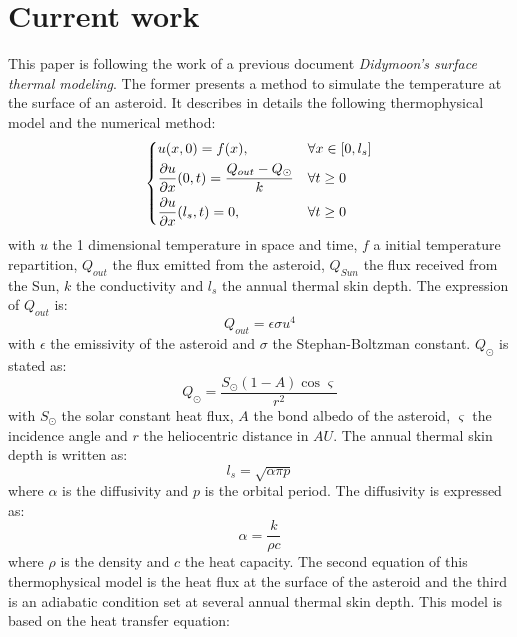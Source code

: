 \section{Current work}
\label{sec:2}

This paper is following the work of a previous document \textit{Didymoon's surface thermal modeling}. The former presents a method to simulate the temperature at the surface of an asteroid. It describes in details the following thermophysical model and the numerical method:
\begin{equation}
    \begin{dcases}
        u(x,0)=f(x),                                                  & \forall x\in[0,l_s] \\
        \frac{\partial{u}}{\partial{x}}(0,t)=\frac{Q_{out}-Q_{\odot}}{k} & \forall t\geq0      \\
        \frac{\partial{u}}{\partial{x}}(l_s,t)=0,                     & \forall t\geq0
    \end{dcases}
    \label{eq:2.1}
\end{equation}
with $u$ the 1 dimensional temperature in space and time, $f$ a initial temperature repartition, $Q_{out}$ the flux emitted from the asteroid, $Q_{Sun}$ the flux received from the Sun, $k$ the conductivity and $l_s$ the annual thermal skin depth. The expression of $Q_{out}$ is:
\begin{equation}
    Q_{out}=\epsilon\sigma u^4
    \label{eq:2.2}
\end{equation}
with $\epsilon$ the emissivity of the asteroid and $\sigma$ the Stephan-Boltzman constant. $Q_{\odot}$ is stated as:
\begin{equation}
    Q_{\odot}=\frac{S_{\odot}\left(1-A\right)\cos{\varsigma}}{r^2}
    \label{eq:2.3}
\end{equation}
with $S_{\odot}$ the solar constant heat flux, $A$ the bond albedo of the asteroid, $\varsigma$ the incidence angle and $r$ the heliocentric distance in $AU$. The annual thermal skin depth is written as:
\begin{equation}
    l_s=\sqrt{\alpha\pi p}
    \label{eq:2.4}
\end{equation}
where $\alpha$ is the diffusivity and $p$ is the orbital period. The diffusivity is expressed as:
\begin{equation}
    \alpha=\frac{k}{\rho c}
    \label{eq:2.5}
\end{equation}
where $\rho$ is the density and $c$ the heat capacity. The second equation of this thermophysical model is the heat flux at the surface of the asteroid and the third is an adiabatic condition set at several annual thermal skin depth. This model is based on the heat transfer equation:
